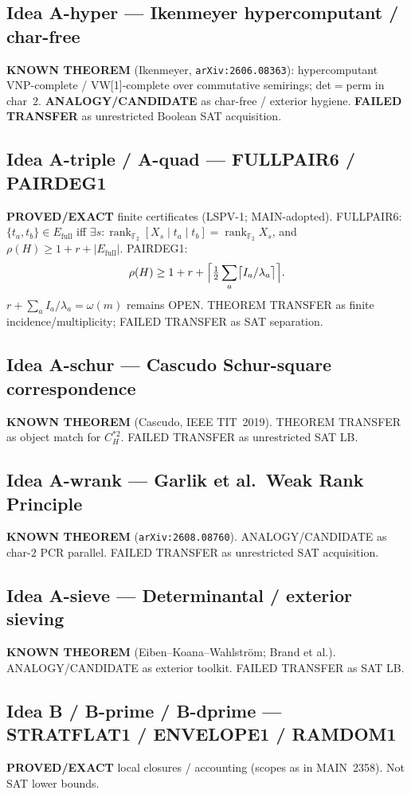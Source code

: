 \documentclass[11pt]{article}
\begin{document}
\subsection*{Idea A-hyper --- Ikenmeyer hypercomputant / char-free}
\textbf{KNOWN THEOREM} (Ikenmeyer, \texttt{arXiv:2606.08363}): hypercomputant
VNP-complete / VW[1]-complete over commutative semirings; det$=$perm in char~$2$.
\textbf{ANALOGY/CANDIDATE} as char-free / exterior hygiene.
\textbf{FAILED TRANSFER} as unrestricted Boolean SAT acquisition.

\subsection*{Idea A-triple / A-quad --- FULLPAIR6 / PAIRDEG1}
\textbf{PROVED/EXACT} finite certificates (LSPV-1; MAIN-adopted).
FULLPAIR6: $\{t_a,t_b\}\in E_{\mathrm{full}}$ iff $\exists s:
\operatorname{rank}_{\mathbb F_2}[X_s\mid t_a\mid t_b]=\operatorname{rank}_{\mathbb F_2}X_s$,
and $\rho(H)\ge 1+r+|E_{\mathrm{full}}|$. PAIRDEG1:
\[
\rho(H)\ge 1+r+\Bigl\lceil\tfrac12\sum_a\bigl\lceil I_a/\lambda_a\bigr\rceil\Bigr\rceil.
\]
$r+\sum_a I_a/\lambda_a=\omega(m)$ remains OPEN. THEOREM TRANSFER as finite
incidence/multiplicity; FAILED TRANSFER as SAT separation.

\subsection*{Idea A-schur --- Cascudo Schur-square correspondence}
\textbf{KNOWN THEOREM} (Cascudo, IEEE TIT~2019). THEOREM TRANSFER as object match
for $C_H^{*2}$. FAILED TRANSFER as unrestricted SAT LB.

\subsection*{Idea A-wrank --- Garlik et al.\ Weak Rank Principle}
\textbf{KNOWN THEOREM} (\texttt{arXiv:2608.08760}). ANALOGY/CANDIDATE as char-$2$
PCR parallel. FAILED TRANSFER as unrestricted SAT acquisition.

\subsection*{Idea A-sieve --- Determinantal / exterior sieving}
\textbf{KNOWN THEOREM} (Eiben--Koana--Wahlstr\"om; Brand et al.). ANALOGY/CANDIDATE
as exterior toolkit. FAILED TRANSFER as SAT LB.

\subsection*{Idea B / B-prime / B-dprime --- STRATFLAT1 / ENVELOPE1 / RAMDOM1}
\textbf{PROVED/EXACT} local closures / accounting (scopes as in MAIN~2358).
Not SAT lower bounds.
\end{document}
